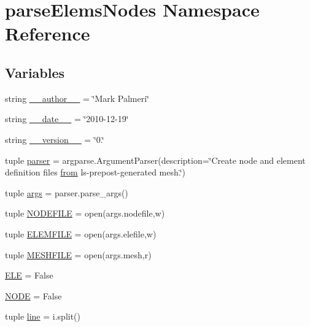 \hypertarget{namespaceparseElemsNodes}{}\section{parse\+Elems\+Nodes Namespace Reference}
\label{namespaceparseElemsNodes}
\subsection*{Variables}
\begin{DoxyCompactItemize}
\item 
string \hyperlink{namespaceparseElemsNodes_a816a21b3796b5cf3c6dce3fd06cb43ec}{\+\_\+\+\_\+author\+\_\+\+\_\+} = \char`\"{}Mark Palmeri\char`\"{}
\item 
string \hyperlink{namespaceparseElemsNodes_a647fd7046abaee7be08d054e074601a7}{\+\_\+\+\_\+date\+\_\+\+\_\+} = \char`\"{}2010-\/12-\/19\char`\"{}
\item 
string \hyperlink{namespaceparseElemsNodes_afc893aaa0394f199b6eac48967da8bf2}{\+\_\+\+\_\+version\+\_\+\+\_\+} = \char`\"{}0.\char`\"{}
\item 
tuple \hyperlink{namespaceparseElemsNodes_a95f874234ce24397d1e88704544a3da0}{parser} = argparse.\+Argument\+Parser(description=\char`\"{}Create node and element definition files \hyperlink{field2dyna_8m_a4c59e51b61bbb48762ded4f701681494}{from} ls-\/prepost-\/generated mesh.\char`\"{})
\item 
tuple \hyperlink{namespaceparseElemsNodes_a3ed72f70be7277e43efb3329d63f5aad}{args} = parser.\+parse\+\_\+args()
\item 
tuple \hyperlink{namespaceparseElemsNodes_a63635a902bbe24578f2c3769b65741b8}{N\+O\+D\+E\+F\+I\+L\+E} = open(args.\+nodefile,\textquotesingle{}w\textquotesingle{})
\item 
tuple \hyperlink{namespaceparseElemsNodes_aeb290ae55bba5b8886f86f4c27eb6487}{E\+L\+E\+M\+F\+I\+L\+E} = open(args.\+elefile,\textquotesingle{}w\textquotesingle{})
\item 
tuple \hyperlink{namespaceparseElemsNodes_adce8ae499592f36beedd7667957eaa5a}{M\+E\+S\+H\+F\+I\+L\+E} = open(args.\+mesh,\textquotesingle{}r\textquotesingle{})
\item 
\hyperlink{namespaceparseElemsNodes_aa07c055475a83647de8806433f7f265c}{E\+L\+E} = False
\item 
\hyperlink{namespaceparseElemsNodes_af0b0d9d032d7fce7e3c0c1e3468b46ef}{N\+O\+D\+E} = False
\item 
tuple \hyperlink{namespaceparseElemsNodes_a0409c90a612f75ca8a96b04f30c3af99}{line} = i.\+split()
\end{DoxyCompactItemize}



